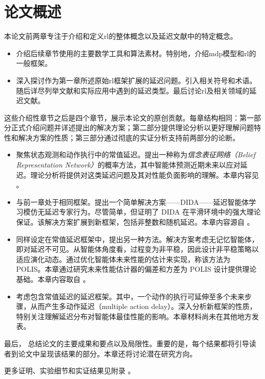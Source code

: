 \section{论文概述}

本论文前两章专注于介绍和定义\gls{rl}的整体概念以及延迟文献中的特定概念。

\begin{itemize}
    \item {} 介绍后续章节使用的主要数学工具和算法素材。特别地，介绍\gls{mdp}模型和\gls{rl}的一般框架。
    \item {} 深入探讨作为第一章所述原始\gls{rl}框架扩展的延迟问题。引入相关符号和术语。随后详尽列举文献和实际应用中遇到的延迟类型。最后讨论\gls{rl}及相关领域的延迟文献。
\end{itemize}

\noindent 这些介绍性章节之后是四个章节，展示本论文的原创贡献。每章结构相同：第一部分正式介绍问题并详述提出的解决方案；第二部分提供理论分析以更好理解问题特性和解决方案的性质；第三部分通过彻底的实证分析支持前两部分的论断。

\begin{itemize}
    \item {} 聚焦状态观测和动作执行中的常值延迟。提出一种称为\emph{信念表征网络（Belief Representation Network）}的概率方法，其中智能体预测近期未来以应对延迟。理论分析将提供对这类延迟问题及其对性能负面影响的理解。本章内容见 \cite{liotet2021learning}。
    \item {} 与前一章处于相同框架。提出一个简单解决方案——{DIDA}——延迟智能体学习模仿无延迟专家行为。尽管简单，但证明了 DIDA 在平滑环境中的强大理论保证。该解决方案扩展到新框架，包括非整数和随机延迟。本章内容源自 \cite{liotet2022delayed}。
    \item {} 同样设定在常值延迟框架中，提出另一种方法。解决方案考虑无记忆智能体，即对延迟不可见。从智能体角度看，过程变为非平稳，因此设计非平稳策略以适应演化动态。通过优化智能体未来性能的估计来实现，称该方法为 POLIS。本章通过研究未来性能估计器的偏差和方差为 POLIS 设计提供理论基础。本章内容取自 \cite{liotet2022lifelong}。
    \item {} 考虑包含常值延迟的延迟框架。其中，一个动作的执行可延伸至多个未来步骤，从而产生多动作延迟（multiple action delay）。深入分析新框架的性质，特别关注理解延迟分布对智能体最佳性能的影响。本章材料尚未在其他地方发表。
\end{itemize}

最后， 总结论文的主要成果和要点以及局限性。重要的是，每个结果都将引导读者到论文中呈现该结果的部分。本章还将讨论潜在研究方向。

更多证明、实验细节和实证结果见附录 。
